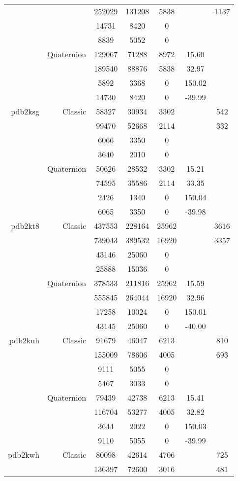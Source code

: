 \begin{xltabular}{\textwidth}{r|rcccSc}
& & 252029 & 131208 & 5838 & & 1137 \\
& & 14731 & 8420 & 0 & & \\
& & 8839 & 5052 & 0 & & \\
& Quaternion & 129067 & 71288 & 8972 & 15.60 & \\
& & 189540 & 88876 & 5838 & 32.97 & \\
& & 5892 & 3368 & 0 & 150.02 & \\
& & 14730 & 8420 & 0 & -39.99 & \\ \addlinespace
pdb2ksg & Classic & 58327 & 30934 & 3302 & & 542 \\
& & 99470 & 52668 & 2114 & & 332 \\
& & 6066 & 3350 & 0 & & \\
& & 3640 & 2010 & 0 & & \\
& Quaternion & 50626 & 28532 & 3302 & 15.21 & \\
& & 74595 & 35586 & 2114 & 33.35 & \\
& & 2426 & 1340 & 0 & 150.04 & \\
& & 6065 & 3350 & 0 & -39.98 & \\ \addlinespace
pdb2kt8 & Classic & 437553 & 228164 & 25962 & & 3616 \\
& & 739043 & 389532 & 16920 & & 3357 \\
& & 43146 & 25060 & 0 & & \\
& & 25888 & 15036 & 0 & & \\
& Quaternion & 378533 & 211816 & 25962 & 15.59 & \\
& & 555845 & 264044 & 16920 & 32.96 & \\
& & 17258 & 10024 & 0 & 150.01 & \\
& & 43145 & 25060 & 0 & -40.00 & \\ \addlinespace
pdb2kuh & Classic & 91679 & 46047 & 6213 & & 810 \\
& & 155009 & 78606 & 4005 & & 693 \\
& & 9111 & 5055 & 0 & & \\
& & 5467 & 3033 & 0 & & \\
& Quaternion & 79439 & 42738 & 6213 & 15.41 & \\
& & 116704 & 53277 & 4005 & 32.82 & \\
& & 3644 & 2022 & 0 & 150.03 & \\
& & 9110 & 5055 & 0 & -39.99 & \\ \addlinespace
pdb2kwh & Classic & 80098 & 42614 & 4706 & & 725 \\
& & 136397 & 72600 & 3016 & & 481 \\

\end{xltabular}
